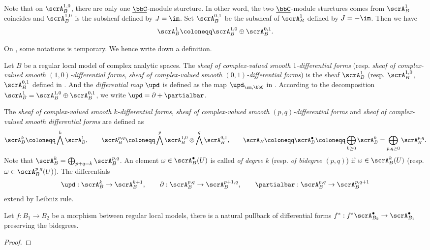 \begin{construction}
	Note that on $\scrA_B^{1,0}$, there are only one $\underline{\bbC}$-module sturcture.
	In other word, the two $\underline{\bbC}$-module sturctures comes from $\scrA_B^{1}$ coincides and $\scrA_B^{1,0}$ is the subsheaf defined by $J = \im$.
	Set $\scrA_B^{0,1}$ be the subsheaf of $\scrA_B^1$ defined by $J = -\im$.
	Then we have
	\[ \scrA^1_B \coloneqq \scrA_B^{1,0} \oplus \scrA_{B}^{0,1}. \]
\end{construction}

On \Yang{}, some notations is temporary.
We hence write down a definition.

\begin{definition}
	Let $B$ be a regular local model of complex analytic spaces.
	The \emph{sheaf of complex-valued smooth $1$-differential forms} (resp. \emph{sheaf of complex-valued smooth $(1,0)$-differential forms}, \emph{sheaf of complex-valued smooth $(0,1)$-differential forms}) is the sheaf $\scrA_B^1$ (resp. $\scrA_B^{1,0}$, $\scrA_B^{0,1}$ defined in \Yang{}.
	And the \emph{differential map $\upd$} is defined as the map $\upd_{\sm,\bbC}$ in \Yang{}.
	According to the decomposition $\scrA_B^1 = \scrA_B^{1,0} \oplus \scrA_B^{0,1}$, we write $\upd = \partial + \partialbar$.

	The \emph{sheaf of complex-valued smooth $k$-differential forms}, \emph{sheaf of complex-valued smooth $(p,q)$-differential forms} and \emph{sheaf of complex-valued smooth differential forms} are defined as
	\[ \scrA_B^k \coloneqq \bigwedge^k \scrA_B^1, \qquad \scrA_B^{p,q} \coloneqq \bigwedge^p \scrA_B^{1,0} \otimes \bigwedge^q \scrA_B^{0,1}, \qquad \scrA_B \coloneqq \scrA_B^\bullet \coloneqq \bigoplus_{k\geq 0} \scrA_B^k = \bigoplus_{p,q \geq 0} \scrA_B^{p,q}. \]
	Note that $\scrA_B^k = \bigoplus_{p+q=k} \scrA_B^{p,q}$.
	An element $\omega \in \scrA_B^\bullet(U)$ is called \emph{of degree $k$} (resp. \emph{of bidegree $(p,q)$}) if $\omega \in \scrA_B^k(U)$ (resp. $\omega \in \scrA_B^{p,q}(U)$).
	The differentials
	\[ \upd: \scrA_B^k \to \scrA_B^{k+1}, \qquad \partial: \scrA_B^{p,q} \to \scrA_B^{p+1,q}, \qquad \partialbar: \scrA_B^{p,q} \to \scrA_B^{p,q+1} \]
	extend by Leibniz rule.
\end{definition}


\begin{lemma}
	Let $f: B_1 \to B_2$ be a morphism between regular local models, there is a natural pullback of differential forms $f^*: f^*\scrA^\bullet_{B_2} \to \scrA^\bullet_{B_1}$ preserving the bidegrees.
	\Yang{}
\end{lemma}
\begin{proof}
	\Yang{}
\end{proof}


